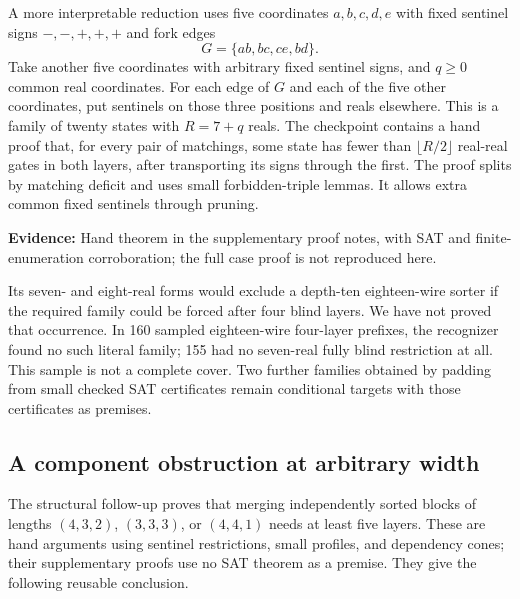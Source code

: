 \documentclass[11pt]{article}
\newcommand{\status}[1]{\textbf{Evidence:} #1.}
\begin{document}
A more interpretable reduction uses five coordinates $a,b,c,d,e$ with fixed sentinel signs $-,-,+,+,+$ and fork edges
\[
G=\{ab,bc,ce,bd\}.
\]
Take another five coordinates with arbitrary fixed sentinel signs, and $q\ge0$ common real coordinates. For each edge of $G$ and each of the five other coordinates, put sentinels on those three positions and reals elsewhere. This is a family of twenty states with $R=7+q$ reals. The checkpoint contains a hand proof that, for every pair of matchings, some state has fewer than $\lfloor R/2\rfloor$ real-real gates in both layers, after transporting its signs through the first. The proof splits by matching deficit and uses small forbidden-triple lemmas. It allows extra common fixed sentinels through pruning.

\status{Hand theorem in the supplementary proof notes, with SAT and finite-enumeration corroboration; the full case proof is not reproduced here}

Its seven- and eight-real forms would exclude a depth-ten eighteen-wire sorter if the required family could be forced after four blind layers. We have not proved that occurrence. In 160 sampled eighteen-wire four-layer prefixes, the recognizer found no such literal family; 155 had no seven-real fully blind restriction at all. This sample is not a complete cover. Two further families obtained by padding from small checked SAT certificates remain conditional targets with those certificates as premises.

\subsection{A component obstruction at arbitrary width}\label{sec:components}
The structural follow-up proves that merging independently sorted blocks of lengths $(4,3,2)$, $(3,3,3)$, or $(4,4,1)$ needs at least five layers. These are hand arguments using sentinel restrictions, small profiles, and dependency cones; their supplementary proofs use no SAT theorem as a premise. They give the following reusable conclusion.
\end{document}
